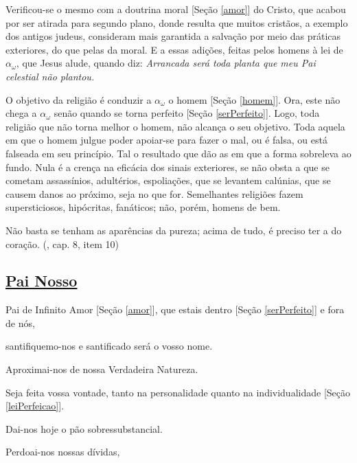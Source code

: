\documentclass[12pt,a4paper]{article}
\begin{document}
				Verificou-se o mesmo com a doutrina moral [Se\c{c}\~ao \ref{amor}] do Cristo, que acabou por ser atirada para segundo plano, donde resulta que muitos crist\~aos, a exemplo dos antigos judeus, consideram mais garantida a salva\c{c}\~ao \cite{salvacao} por meio das pr\'aticas exteriores, do que pelas da moral. E a essas adi\c{c}\~oes, feitas pelos homens \`a lei de $ \alpha_\omega $, que Jesus alude, quando diz: \emph{Arrancada ser\'a toda planta que meu Pai celestial n\~ao plantou.}

				O objetivo da religi\~ao \'e conduzir a $ \alpha_\omega $ o homem [Se\c{c}\~ao \ref{homem}]. Ora, este n\~ao chega a $ \alpha_\omega $ sen\~ao quando se torna perfeito [Se\c{c}\~ao \ref{serPerfeito}]. Logo, toda religi\~ao que n\~ao torna melhor o homem, n\~ao alcan\c{c}a o seu objetivo. Toda aquela em que o homem julgue poder apoiar-se para fazer o mal, ou \'e falsa, ou est\'a falseada em seu princ\'ipio. Tal o resultado que d\~ao as em que a forma sobreleva ao fundo. Nula \'e a cren\c{c}a na efic\'acia dos sinais exteriores, se n\~ao obsta a que se cometam assass\'inios, adult\'erios, espolia\c{c}\~oes, que se levantem cal\'unias, que se causem danos ao pr\'oximo, seja no que for. Semelhantes religi\~oes fazem supersticiosos, hip\'ocritas, fan\'aticos; n\~ao, por\'em, homens de bem.

				N\~ao basta se tenham as apar\^encias da pureza; acima de tudo, \'e preciso ter a do cora\c{c}\~ao. (\cite{ese}, cap. 8, item 10)

		\subsection{\href{http://sites.google.com/site/mathspirituality/portugues/PaiNosso.ASF?attredirects=0}{Pai Nosso}}\label{PaiNosso}
			\begin{flushright}
			\end{flushright}

			Pai de Infinito Amor [Se\c{c}\~ao \ref{amor}], que estais dentro [Se\c{c}\~ao \ref{serPerfeito}] e fora de n\'os,

			santifiquemo-nos e santificado ser\'a o vosso nome.

			Aproximai-nos de nossa Verdadeira Natureza.

			Seja feita vossa vontade, tanto na personalidade quanto na individualidade [Se\c{c}\~ao \ref{leiPerfeicao}].

			Dai-nos hoje o p\~ao sobressubstancial.

			Perdoai-nos nossas d\'ividas,
\end{document}
